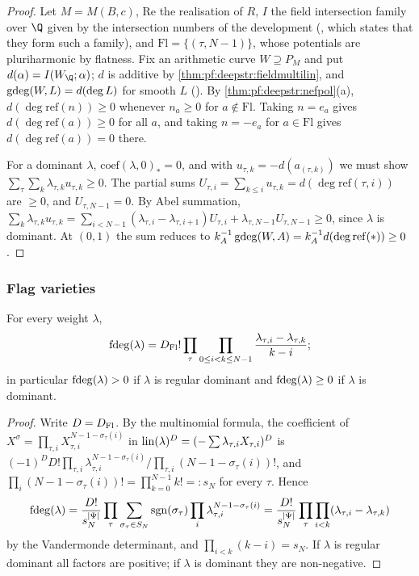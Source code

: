 \begin{proof}
Let $M=M(B,c)$, $\mathrm{Re}$ the realisation of $R$, $I$ the field intersection family over $\Q$ given by the
intersection numbers of the development (,
which states that they form such a family), and $\mathrm{Fl}=\{(\tau,N-1)\}$, whose potentials are pluriharmonic by
flatness. Fix an arithmetic curve $W\supseteq P_M$ and put $d(\alpha)=I(W_\Q;\alpha)$; $d$ is additive by
\cref{thm:pf:deepstr:fieldmultilin}, and $\operatorname{gdeg}(W,L)=d(\deg L)$ for smooth $L$
(). By \cref{thm:pf:deepstr:nefpol}(a),
$d(\deg\mathrm{ref}(n))\ge0$ whenever $n_a\ge0$ for $a\notin\mathrm{Fl}$. Taking $n=e_a$ gives $d(\deg\mathrm{ref}(a))\ge0$ for all $a$,
and taking $n=-e_a$ for $a\in\mathrm{Fl}$ gives $d(\deg\mathrm{ref}(a))=0$ there.

For a dominant $\lambda$, $\mathrm{coef}(\lambda,0)_\ast=0$, and with $u_{\tau,k}=-d(a_{(\tau,k)})$ we must show
$\sum_\tau\sum_k\lambda_{\tau,k}u_{\tau,k}\ge0$. The partial sums $U_{\tau,i}=\sum_{k\le i}u_{\tau,k}=d(\deg\mathrm{ref}(\tau,i))$ are $\ge0$, and
$U_{\tau,N-1}=0$. By Abel summation,
$\sum_k\lambda_{\tau,k}u_{\tau,k}=\sum_{i<N-1}(\lambda_{\tau,i}-\lambda_{\tau,i+1})U_{\tau,i}+\lambda_{\tau,N-1}U_{\tau,N-1}\ge0$, since $\lambda$ is
dominant. At $(0,1)$ the sum reduces to $k_A^{-1}\operatorname{gdeg}(W,A)=k_A^{-1}d(\deg\mathrm{ref}(\ast))\ge0$.
\end{proof}

\subsubsection*{Flag varieties}

\begin{proposition}\label{prop:pf:deepstr:flagdeg}
For every weight $\lambda$,
\[
\operatorname{fdeg}(\lambda)=D_{\mathrm{Fl}}!\prod_\tau\prod_{0\le i<k\le N-1}\frac{\lambda_{\tau,i}-\lambda_{\tau,k}}{k-i};
\]
in particular $\operatorname{fdeg}(\lambda)>0$ if $\lambda$ is regular dominant and $\operatorname{fdeg}(\lambda)\ge0$ if $\lambda$ is dominant.
\end{proposition}

\begin{proof}
Write $D=D_{\mathrm{Fl}}$. By the multinomial formula, the coefficient of $X^\sigma=\prod_{\tau,i}X_{\tau,i}^{N-1-\sigma_\tau(i)}$ in
$\operatorname{lin}(\lambda)^D=(-\sum\lambda_{\tau,i}X_{\tau,i})^D$ is $(-1)^DD!\prod_{\tau,i}\lambda_{\tau,i}^{N-1-\sigma_\tau(i)}/\prod_{\tau,i}(N-1-\sigma_\tau(i))!$, and
$\prod_i(N-1-\sigma_\tau(i))!=\prod_{k=0}^{N-1}k!=:s_N$ for every $\tau$. Hence
\[
\operatorname{fdeg}(\lambda)=\frac{D!}{s_N^{|\Psi|}}\prod_\tau\sum_{\sigma_\tau\in S_N}\operatorname{sgn}(\sigma_\tau)\prod_i\lambda_{\tau,i}^{N-1-\sigma_\tau(i)}
=\frac{D!}{s_N^{|\Psi|}}\prod_\tau\prod_{i<k}(\lambda_{\tau,i}-\lambda_{\tau,k})
\]
by the Vandermonde determinant, and $\prod_{i<k}(k-i)=s_N$. If $\lambda$ is regular dominant all factors are positive; if
$\lambda$ is dominant they are non-negative.
\end{proof}

